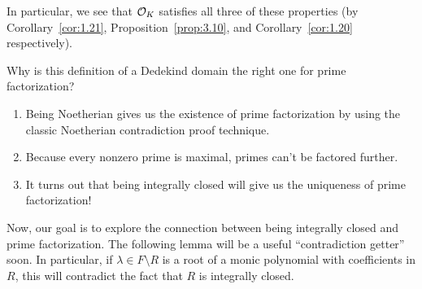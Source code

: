 In particular, we see that ${\cal O}_K$ satisfies all three of these 
properties (by Corollary~\ref{cor:1.21}, Proposition~\ref{prop:3.10}, 
and Corollary~\ref{cor:1.20} respectively). 

Why is this definition of a Dedekind domain the right one 
for prime factorization? 
\begin{enumerate}[(1)]
    \item Being Noetherian gives us the existence of prime 
    factorization by using the classic Noetherian contradiction proof technique.
    \item Because every nonzero prime is maximal, primes can't be factored further.
    \item It turns out that being integrally closed will give us the uniqueness 
    of prime factorization!
\end{enumerate}
Now, our goal is to explore the connection between being integrally closed 
and prime factorization. The following lemma will be a useful ``contradiction 
getter'' soon. In particular, if $\lambda \in F \setminus R$ is a root of a 
monic polynomial with coefficients in $R$, this will contradict the 
fact that $R$ is integrally closed.

